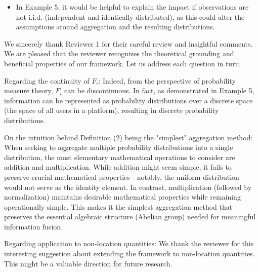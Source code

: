 \documentclass[letterpaper]{article} %
\begin{document}
\begin{CJK*}{UTF8}{gbsn}
\begin{itemize}
\item In Example 5, it would be helpful to explain the impact if observations are not i.i.d. (independent and identically distributed), as this could alter the assumptions around aggregation and the resulting distributions.
\end{itemize}   





We sincerely thank Reviewer 1 for their careful review and insightful comments. We are pleased that the reviewer recognizes the theoretical grounding and beneficial properties of our framework. Let us address each question in turn:

Regarding the continuity of $F_i$:
Indeed, from the perspective of probability measure theory, $F_i$ can be discontinuous. In fact, as demonstrated in Example 5, information can be represented as probability distributions over a discrete space (the space of all users in a platform), resulting in discrete probability distributions.

On the intuition behind Definition (2) being the "simplest" aggregation method:
When seeking to aggregate multiple probability distributions into a single distribution, the most elementary mathematical operations to consider are addition and multiplication. While addition might seem simple, it fails to preserve crucial mathematical properties - notably, the uniform distribution would not serve as the identity element. In contrast, multiplication (followed by normalization) maintains desirable mathematical properties while remaining operationally simple. This makes it the simplest aggregation method that preserves the essential algebraic structure (Abelian group) needed for meaningful information fusion.

Regarding application to non-location quantities:
We thank the reviewer for this interesting suggestion about extending the framework to non-location quantities. This might be a valuable direction for future research.



\end{CJK*}
\end{document}
